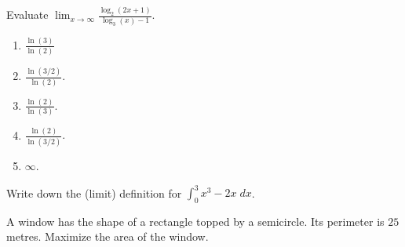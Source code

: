 \documentclass[../main.tex]{subfiles}
\begin{document}
\vfill{}
\clearpage

\begin{exercise}
  Evaluate \(\lim_{x \to \infty} \frac{\log_{2}(2x + 1)}{\log_{3}(x)-1}\).

  \begin{enumerate}[label=\Alph*.]
    \item \(\frac{\ln(3)}{\ln(2)}\)
    \item \(\frac{\ln(3/2)}{\ln(2)}\).
    \item \(\frac{\ln(2)}{\ln(3)}\).
    \item \(\frac{\ln(2)}{\ln(3/2)}\).
    \item \(\infty\).
  \end{enumerate}
\end{exercise}

\vfill{}

\begin{exercise}
  Write down the (limit) definition for \(\int_{0}^{3} x^{3} - 2x \;dx\).

  \vspace{2in}
\end{exercise}
\vfill{}
\clearpage

\begin{exercise}
  A window has the shape of a rectangle topped by a semicircle. Its perimeter is \(25\) metres.  Maximize the area of the window. 
\end{exercise}
\end{document}
